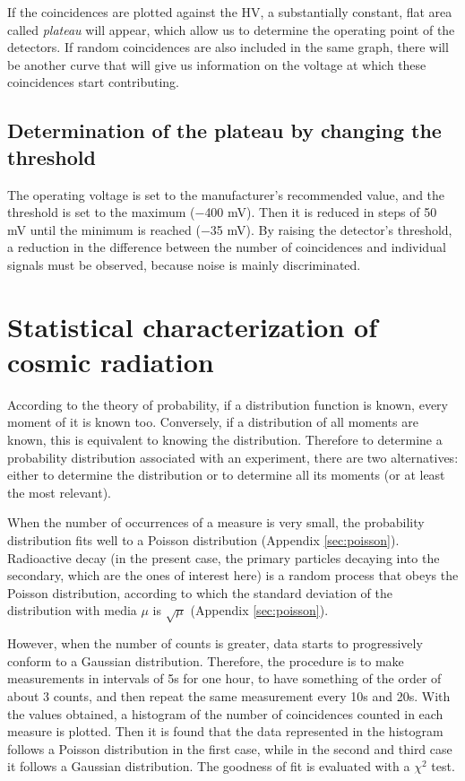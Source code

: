If the coincidences are plotted against the HV, a substantially constant, flat area called \textit{plateau} will appear, which allow us to determine the operating point of the detectors. If random coincidences are also included in the same graph, there will be another curve that will give us information on the voltage at which these coincidences start contributing.


	\subsection{Determination of the plateau by changing the threshold}

The operating voltage is set to the manufacturer's recommended value,  and the threshold is set to the maximum ($-$400 mV). Then it is reduced  in steps of 50 mV until the minimum is reached ($-$35 mV). By raising the detector's threshold, a reduction in the difference between the number of coincidences and individual signals must be observed, because noise is mainly discriminated.

	\section{Statistical characterization of cosmic radiation}

According to the theory of probability, if a distribution function is known, every moment of it is known too. Conversely, if a distribution of all moments are known, this is equivalent to knowing the distribution. Therefore to determine a probability distribution associated with an experiment, there are two alternatives: either to determine the distribution or to determine all its moments (or at least the most relevant).

When the number of occurrences of a measure is very small, the probability distribution fits well to a Poisson distribution (Appendix \ref{sec:poisson}). Radioactive decay (in the present case, the primary particles decaying into the secondary, which are the ones of interest here) is a random process that obeys the Poisson distribution, according to which the standard deviation of the distribution with media $\mu$ is $\sqrt{\mu}$ (Appendix \ref{sec:poisson}).

However, when the number of counts is greater, data starts to progressively conform to a Gaussian distribution. Therefore, the procedure is to make measurements in intervals of 5s for one hour, to have something of the order of about 3 counts, and then repeat the same measurement every 10s and 20s. With the values ​​obtained, a histogram of the number of coincidences counted in each measure is plotted. Then it is found that the data represented in the histogram follows a Poisson distribution in the first case, while in the second and third case it follows a Gaussian distribution. The goodness of fit is evaluated with a $\chi^2$ test.


